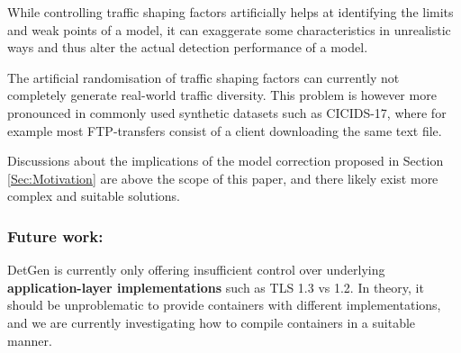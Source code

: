 While controlling traffic shaping factors artificially helps at identifying the limits and weak points of a model, it can exaggerate some characteristics in unrealistic ways and thus alter the actual detection performance of a model. 

The artificial randomisation of traffic shaping factors can currently not completely generate real-world traffic diversity. This problem is however more pronounced in commonly used synthetic datasets such as CICIDS-17, where for example most FTP-transfers consist of a client downloading the same text file.

Discussions about the implications of the model correction proposed in Section \ref{Sec:Motivation} are above the scope of this paper, and there likely exist more complex and suitable solutions.

\subsubsection*{Future work:}





DetGen is currently only offering insufficient control over underlying \textbf{application-layer implementations} such as TLS 1.3 vs 1.2. In theory, it should be unproblematic to provide containers with different implementations, and we are currently investigating how to compile containers in a suitable manner.

